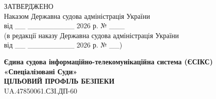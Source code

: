 \documentclass[10pt]{article}
\begin{document}
\begin{flushright}
ЗАТВЕРДЖЕНО\\
Наказом Державна судова адміністрація України\\
від \_\_ \_\_\_\_\_\_\_\_\_ 2026 р. № \_\_\_\\
(в редакції наказу Державна судова адміністрація України\\
від \_\_ \_\_\_\_\_\_\_\_\_ 2026 р. № \_\_)
\end{flushright}

\vspace{2cm}

\begin{center}
\textbf{\Large Єдина судова інформаційно-телекомунікаційна система (ЄСІКС)}\\
\textbf{\Large «Спеціалізовані Суди»}\\
\vspace{1cm}
\textbf{\Large ЦІЛЬОВИЙ ПРОФІЛЬ БЕЗПЕКИ}\\
\vspace{0.5cm}
\large UA.47850061.СЗІ.ДП-60
\end{center}

\newpage
\end{document}

